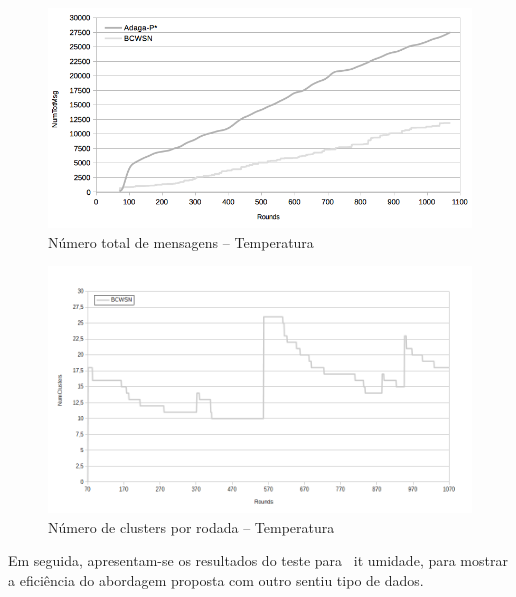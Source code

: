 \documentclass{acm_proc_article-sp}
\begin{document}
\begin{figure}[!htb]
\begin{center}
	\includegraphics[scale=0.30]{BCWSN-TotNumMsgxRound-PB-Temp.png}
	 \vspace*{-.6cm}
	\caption{Número total de mensagens – Temperatura}
    \label{fig:tot-num-msg}
\end{center}
\end{figure}
\vspace*{-.3cm}

\begin{figure}[!htb]
\begin{center}
	\includegraphics[scale=0.32]{BCWSN-NumClustersxRound-PB.png}
	 \vspace*{-.6cm}
	\caption{Número de clusters por rodada – Temperatura}
    \label{fig:num-clts}
\end{center}
\end{figure}

Em seguida, apresentam-se os resultados do teste para {\ it umidade}, para mostrar a eficiência do 
abordagem proposta com outro sentiu tipo de dados.
\vspace*{-.3cm}
\end{document}
